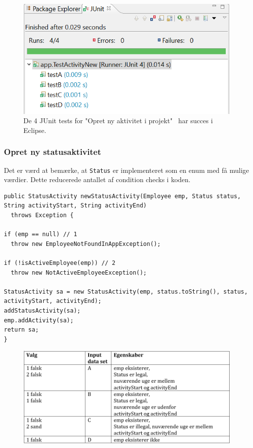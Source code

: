 \begin{figure}[H]
    \centering
    \includegraphics[width = 0.5 \textwidth]{Figurer/whitebox2succes.PNG}
    \caption{De 4 JUnit tests for "Opret ny aktivitet i projekt" $\,$ har succes i Eclipse.}
    \label{fig:whitebox2succes}
\end{figure}


\subsubsection{Opret ny statusaktivitet}
Det er værd at bemærke, at \texttt{Status} er implementeret som en enum med få mulige værdier. Dette reducerede antallet af condition checks i koden. 

\begin{lstlisting}
public StatusActivity newStatusActivity(Employee emp, Status status, String activityStart, String activityEnd)
  throws Exception {

if (emp == null) // 1
  throw new EmployeeNotFoundInAppException();

if (!isActiveEmployee(emp)) // 2
  throw new NotActiveEmployeeException();

StatusActivity sa = new StatusActivity(emp, status.toString(), status, activityStart, activityEnd);
addStatusActivity(sa);
emp.addActivity(sa);
return sa;
}
\end{lstlisting}

\begin{figure}[H]
    \centering
    \includegraphics[width = \textwidth]{Figurer/whitebox3a.PNG}
    \label{fig:whitebox3a}
\end{figure}

